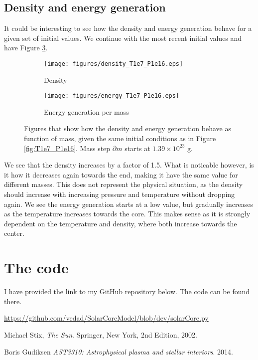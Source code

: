 \documentclass[a4paper, 11pt, english]{article}
\newcommand{\refig}[1]{\textcolor{blue}{\ref{fig:#1}}} %
\begin{document}
\subsection{Density and energy generation}
It could be interesting to see how the density and energy generation behave for a given
set of initial values. We continue with the most recent initial values and have Figure
\refig{density_epsilon}.
%
\begin{figure}[htpb]
	\centering
	\begin{subfigure}{0.49\textwidth}
		\texttt{[image: figures/density\_T1e7\_P1e16.eps]}
		\caption{Density}
		\label{fig:density_T1e7_P1e16}
	\end{subfigure}\hfill
	\begin{subfigure}{0.49\textwidth}
		\texttt{[image: figures/energy\_T1e7\_P1e16.eps]}
		\caption{Energy generation per mass}
		\label{fig:epsilon_T1e7_P1e16}
	\end{subfigure}
	\vspace{0.2cm}
	\caption{Figures that show how the density and energy generation behave as function of
		mass, given the same initial conditions as in Figure \refig{T1e7_P1e16}. Mass step
		$\partial m$ starts at $ 1.39 \times 10^{23}$ g.}
	\label{fig:density_epsilon}
\end{figure}
%
We see that the density increases by a factor of 1.5. What is noticable however, is it how
it decreases again towards the end, making it have the same value for different masses.
This does not represent the physical situation, as the density should increase with
increasing pressure and temperature without dropping again. We see the energy generation
starts at a low value, but gradually increases as the temperature increases towards the core.
This makes sense as it is strongly dependent on the temperature and density, where both
increase towards the center.

\section{The code}
I have provided the link to my GitHub repository below. The code can be found there.

%
\url{https://github.com/vedad/SolarCoreModel/blob/dev/solarCore.py}

\begin{thebibliography}{9}
		Michael Stix,
		\emph{The Sun}.
		Springer, New York,
		2nd Edition,
		2002.

		Boris Gudiksen
		\emph{AST3310: Astrophysical plasma and stellar interiors}.
		2014.

\end{thebibliography}
\end{document}
